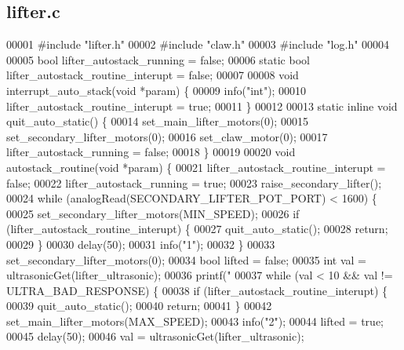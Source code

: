 \subsection{lifter.\+c}
\label{lifter_8c_source}

\begin{DoxyCode}
00001 \textcolor{preprocessor}{#include "lifter.h"}
00002 \textcolor{preprocessor}{#include "claw.h"}
00003 \textcolor{preprocessor}{#include "log.h"}
00004 
00005 \textcolor{keywordtype}{bool} lifter_autostack_running = \textcolor{keyword}{false};
00006 \textcolor{keyword}{static} \textcolor{keywordtype}{bool} lifter_autostack_routine_interupt = \textcolor{keyword}{false};
00007 
00008 \textcolor{keywordtype}{void} interrupt_auto_stack(\textcolor{keywordtype}{void} *param) \{
00009   info(\textcolor{stringliteral}{"int"});
00010   lifter_autostack_routine_interupt = \textcolor{keyword}{true};
00011 \}
00012 
00013 \textcolor{keyword}{static} \textcolor{keyword}{inline} \textcolor{keywordtype}{void} quit_auto_static() \{
00014   set_main_lifter_motors(0);
00015   set_secondary_lifter_motors(0);
00016   set_claw_motor(0);
00017   lifter_autostack_running = \textcolor{keyword}{false};
00018 \}
00019 
00020 \textcolor{keywordtype}{void} autostack_routine(\textcolor{keywordtype}{void} *param) \{
00021   lifter_autostack_routine_interupt = \textcolor{keyword}{false};
00022   lifter_autostack_running = \textcolor{keyword}{true};
00023   raise_secondary_lifter();
00024   \textcolor{keywordflow}{while} (analogRead(SECONDARY\_LIFTER\_POT\_PORT) < 1600) \{
00025     set_secondary_lifter_motors(MIN\_SPEED);
00026     \textcolor{keywordflow}{if} (lifter_autostack_routine_interupt) \{
00027       quit_auto_static();
00028       \textcolor{keywordflow}{return};
00029     \}
00030     delay(50);
00031     info(\textcolor{stringliteral}{"1"});
00032   \}
00033   set_secondary_lifter_motors(0);
00034   \textcolor{keywordtype}{bool} lifted = \textcolor{keyword}{false};
00035   \textcolor{keywordtype}{int} val = ultrasonicGet(lifter_ultrasonic);
00036   printf(\textcolor{stringliteral}{"%
00037   \textcolor{keywordflow}{while} (val < 10 && val != ULTRA\_BAD\_RESPONSE) \{
00038     \textcolor{keywordflow}{if} (lifter_autostack_routine_interupt) \{
00039       quit_auto_static();
00040       \textcolor{keywordflow}{return};
00041     \}
00042     set_main_lifter_motors(MAX\_SPEED);
00043     info(\textcolor{stringliteral}{"2"});
00044     lifted = \textcolor{keyword}{true};
00045     delay(50);
00046     val = ultrasonicGet(lifter_ultrasonic);
}
\end{DoxyCode}
